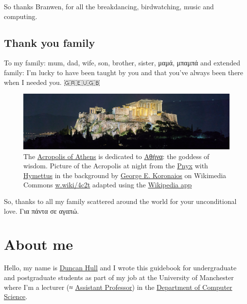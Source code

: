 \documentclass[
]{book}
\begin{document}
So thanks Branwen, for all the breakdancing, birdwatching, music and computing.

\hypertarget{family}{%
\subsection{Thank you family}\label{family}}

To my family: mum, dad, wife, son, brother, sister, μαμά, μπαμπά and extended family: I'm lucky to have been taught by you and that you've always been there when I needed you. 🇬🇷🇪🇺🇬🇧

\begin{figure}
\includegraphics[width=1\linewidth]{images/acropolis-at-night} \caption{The \href{https://en.wikipedia.org/wiki/Acropolis_of_Athens}{Acropolis of Athens} is dedicated to \href{https://en.wikipedia.org/wiki/Athena}{Αθήνα}: the goddess of wisdom. Picture of the Acropolis at night from the \href{https://en.wikipedia.org/wiki/Pnyx}{Pnyx} with \href{https://en.wikipedia.org/wiki/Hymettus}{Hymettus} in the background by \href{https://commons.wikimedia.org/wiki/User:George_E._Koronaios}{George E. Koronaios} on Wikimedia Commons \href{https://w.wiki/4c2t}{w.wiki/4c2t} adapted using the \href{https://apps.apple.com/us/app/wikipedia/id324715238}{Wikipedia app}}\label{fig:acropolis-fig}
\end{figure}



So, thanks to all my family scattered around the world for your unconditional love. Για πάντα σε αγαπώ. 🙏

\hypertarget{duncan}{%
\section{About me}\label{duncan}}

Hello, my name is \href{http://www.cs.man.ac.uk/~hulld/}{Duncan Hull} and I wrote this guidebook for undergraduate and postgraduate students as part of my job at the University of Manchester where I'm a lecturer (≈ \href{https://en.wikipedia.org/wiki/Assistant_professor}{Assistant Professor}) in the \href{https://www.cs.manchester.ac.uk/}{Department of Computer Science}.
\end{document}
